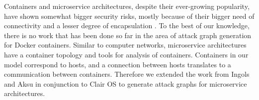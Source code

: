 Containers and microservice architectures, despite their ever-growing popularity, have shown somewhat bigger security risks, mostly because of their bigger need of connectivity and a lesser degree of encapsulation \cite{combe2016docker, dragoni2017microservices}. To the best of our knowledge, there is no work that has been done so far in the area of attack graph generation for Docker containers. Similar to computer networks, microservice architectures have a container topology and tools for analysis of containers. Containers in our model correspond to hosts, and a connection between hosts translates to a communication between containers. Therefore we extended the work from Ingols \cite{ingols2006practical} and Aksu \cite{aksu2018automated} in conjunction to Clair OS \cite{clair} to generate attack graphs for microservice architectures. 

